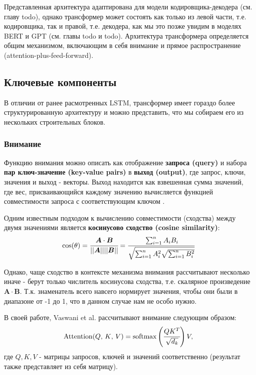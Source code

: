 Представленная архитектура адаптирована для модели кодировщика-декодера 
(см. главу {\color{red} todo}), однако трансформер может состоять как только из 
левой части, т.е. кодировщика, так и правой, т.е. декодера, как мы это позже 
увидим в моделях BERT и GPT (см. главы {\color{red} todo} и {\color{red} todo}). 
Архитектура трансформера определяется общим механизмом, включающим в себя 
внимание и прямое распространение (attention-plus-feed-forward).

\subsection{Ключевые компоненты} %

В отличии от ранее расмотренных LSTM, трансформер имеет гораздо более 
структурированную архитектуру и можно представить, что мы собираем его 
из нескольких строительных блоков.

\subsubsection{Внимание}

Функцию внимания можно описать как отображение \textbf{запроса (query)} 
и набора \textbf{пар ключ-значение (key-value pairs)} в \textbf{выход (output)}, 
где запрос, ключи, значения и выход - векторы. Выход находится как 
взвешенная сумма значений, где вес, присваивающийся каждому значению 
вычисляется функцией совместимости запроса с соответствующим ключом 
\cite{vaswani2017attention}. 

Одним известным подходом к вычислению совместимости (сходства) между двумя значениями 
является \textbf{косинусово сходство (cosine similarity)}:
\begin{equation*}
    \cos(\theta) = \cfrac{\bm{A} \cdot \bm{B}}{|| \bm{A} || || \bm{B} ||} = 
    \cfrac{\sum_{i=1}^n A_i B_i}{\sqrt{\sum_{i=1}^n A_i^2 \sqrt{\sum_{i=1}^n B_i^2}}}
\end{equation*}

Однако, чаще сходство в контексте механизма внимания рассчитывают несколько иначе - 
берут только числитель косинусова сходства, т.е. скалярное 
произведение $\bm{A} \cdot \bm{B}$. Т.к. знаменатель всего навсего 
нормирует значения, чтобы они были в диапазоне от -1 до 1, что в данном случае нам не 
особо нужно. 

В своей работе, Vaswani et al. рассчитывают внимание следующим образом:
\begin{equation*}
    \text{Attention($Q$, $K$, $V$)} = \text{softmax} \left( \cfrac{Q K^T}{\sqrt{d_k}} \right) V,
\end{equation*}
где $Q, K, V$ - матрицы запросов, ключей и значений соответственно (результат 
также представляет из себя матрицу).

